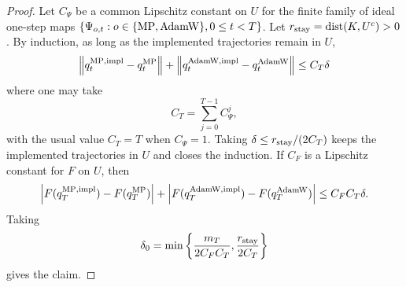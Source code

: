 \begin{proof}
Let $C_\Psi$ be a common Lipschitz constant on $U$ for the finite family of ideal
one-step maps $\{\Psi_{o,t}:o\in\{\operatorname{MP},\operatorname{AdamW}\},0\leq t<T\}$.  Let
$r_{\rm stay}=\operatorname{dist}(K,U^c)>0$.
By induction, as long as the implemented trajectories remain in $U$,
\begin{equation}
    \left\lVert q_t^{\operatorname{MP},{\rm impl}}-q_t^{\operatorname{MP}} \right\rVert
    +
    \left\lVert q_t^{\operatorname{AdamW},{\rm impl}}-q_t^{\operatorname{AdamW}} \right\rVert
    \leq C_T\delta
\end{equation}
where one may take
\begin{equation}
    C_T=\sum_{j=0}^{T-1}C_\Psi^j,
\end{equation}
with the usual value $C_T=T$ when $C_\Psi=1$.  Taking
$\delta\leq r_{\rm stay}/(2C_T)$ keeps the implemented trajectories in $U$ and
closes the induction.  If $C_F$ is a Lipschitz constant for $F$ on $U$, then
\begin{equation}
    \left|F(q_T^{\operatorname{MP},{\rm impl}})-F(q_T^{\operatorname{MP}})\right|
    +
    \left|F(q_T^{\operatorname{AdamW},{\rm impl}})-F(q_T^{\operatorname{AdamW}})\right|
    \leq C_F C_T\delta .
\end{equation}
Taking
\begin{equation}
    \delta_0=\min\left\{\frac{m_T}{2C_FC_T},\frac{r_{\rm stay}}{2C_T}\right\}
\end{equation}
gives the claim.
\end{proof}
